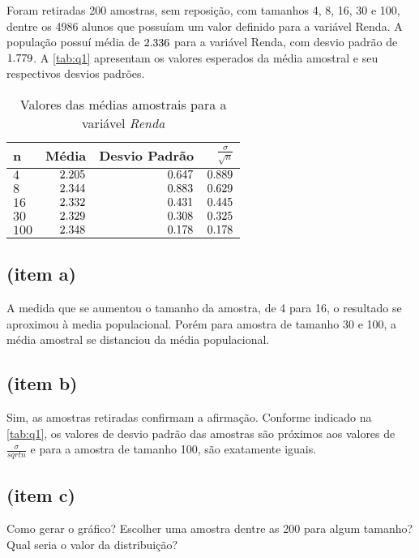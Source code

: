 

Foram retiradas 200 amostras, sem reposição, com tamanhos 4, 8, 16, 30 e 100, 
dentre os 4986 alunos que possuíam um valor definido para a variável Renda.
A população possuí média de ${2.336}$ para a variável Renda, com desvio padrão de
${1.779}$. A \autoref{tab:q1} apresentam os valores esperados da média amostral
e seu respectivos desvios padrões.

\begin{table}[h]
\centering
\caption{Valores das médias amostrais para a variável \textit{Renda}}
\label{tab:q1}
\vspace{0.5em}
\begin{tabular}{l r r r}
	\toprule
	\textbf{n} & \textbf{Média} & \textbf{Desvio Padrão} & \textbf{$\frac{\sigma}{\sqrt{n}}$}\\
	\midrule
	$4$       & ${2.205}$   & ${0.647}$   & ${0.889}$   \\
	$8$       & ${2.344}$   & ${0.883}$   & ${0.629}$   \\
	$16$      & ${2.332}$  & ${0.431}$  & ${0.445}$  \\
	$30$      & ${2.329}$  & ${0.308}$  & ${0.325}$  \\
	$100$     & ${2.348}$ & ${0.178}$ & ${0.178}$ \\
	\bottomrule
\end{tabular}
\end{table}

\subsection{(item a)}
A medida que se aumentou o tamanho da amostra, de 4 para 16, o resultado se aproximou à media populacional.
Porém para amostra de tamanho 30 e 100, a média amostral se distanciou da média populacional.


\subsection{(item b)}
Sim, as amostras retiradas confirmam a afirmação. Conforme indicado na \autoref{tab:q1}, os valores 
de desvio padrão das amostras são próximos aos valores de $\frac{\sigma}{sqrt{n}}$ e para a amostra de tamanho 100, 
são exatamente iguais.

\subsection{(item c)}
Como gerar o gráfico? Escolher uma amostra dentre as 200 para algum tamanho? Qual seria o valor da distribuição?

